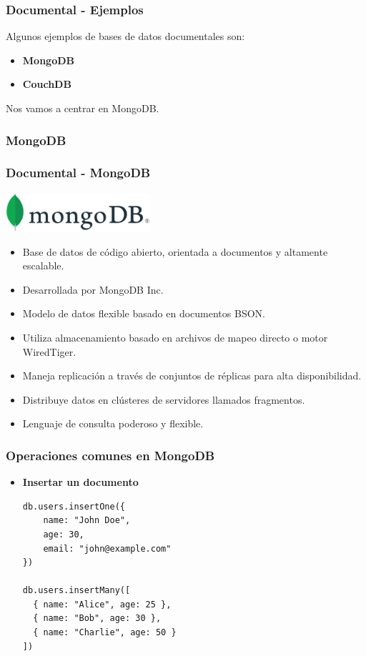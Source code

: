 \begin{frame}
    \frametitle{Documental - Ejemplos}

    Algunos ejemplos de bases de datos documentales son:
    
    \begin{itemize}
        \item \textbf{MongoDB}

        \item \textbf{CouchDB}
    \end{itemize}

     
    
    Nos vamos a centrar en MongoDB.
\end{frame}

\subsubsection{MongoDB}

\begin{frame}
    \frametitle{Documental - MongoDB}

        \centering
    \includegraphics[width=0.4\textwidth]{images/mongodb-logo.png}
    \begin{itemize}
        \item Base de datos de código abierto, orientada a documentos y altamente escalable.  
        \item Desarrollada por MongoDB Inc.  
        \item Modelo de datos flexible basado en documentos BSON.  
        \item Utiliza almacenamiento basado en archivos de mapeo directo o motor WiredTiger.  
        \item Maneja replicación a través de conjuntos de réplicas para alta disponibilidad.  
        \item Distribuye datos en clústeres de servidores llamados fragmentos.  
        \item Lenguaje de consulta poderoso y flexible.
    \end{itemize}

\end{frame}

\begin{frame}[fragile]
\frametitle{Operaciones comunes en MongoDB}
\begin{itemize}
    \item \textbf{Insertar un documento}
    \begin{verbatim}
db.users.insertOne({
    name: "John Doe",
    age: 30,
    email: "john@example.com"
})

db.users.insertMany([
  { name: "Alice", age: 25 },
  { name: "Bob", age: 30 },
  { name: "Charlie", age: 50 }
])
    \end{verbatim}

\end{itemize}
\end{frame}


